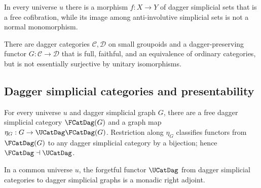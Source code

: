 \begin{resultblock}
\begin{proposition}
In every universe $u$ there is a morphism $f:X\to Y$ of dagger simplicial sets that is a free cofibration, while its image among anti-involutive simplicial sets is not a normal monomorphism.
\end{proposition}
\end{resultblock}

\begin{resultblock}
\begin{proposition}
There are dagger categories $\mathcal C,\mathcal D$ on small groupoids and a dagger-preserving functor $G:\mathcal C\to\mathcal D$ that is full, faithful, and an equivalence of ordinary categories, but is not essentially surjective by unitary isomorphisms.
\end{proposition}
\end{resultblock}

\subsection{Dagger simplicial categories and presentability}

\begin{resultblock}
\begin{theorem}
For every universe $u$ and dagger simplicial graph $G$, there are a free dagger simplicial category $\FCatDag(G)$ and a graph map $\eta_G:G\to\UCatDag\FCatDag(G)$.
Restriction along $\eta_G$ classifies functors from $\FCatDag(G)$ to any dagger simplicial category by a bijection; hence $\FCatDag\dashv\UCatDag$.
\end{theorem}
\end{resultblock}

\begin{resultblock}
\begin{theorem}
In a common universe $u$, the forgetful functor $\UCatDag$ from dagger simplicial categories to dagger simplicial graphs is a monadic right adjoint.
\end{theorem}
\end{resultblock}

